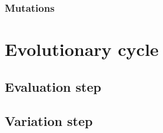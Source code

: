 \documentclass[main]{subfiles}
\begin{document}
\lipsum[14]

\subsubsection{Mutations}

\lipsum[15]

\section{Evolutionary cycle}

\lipsum[16]

\subsection{Evaluation step}

\lipsum[17]

\subsection{Variation step}

\lipsum[18]

\end{document}
